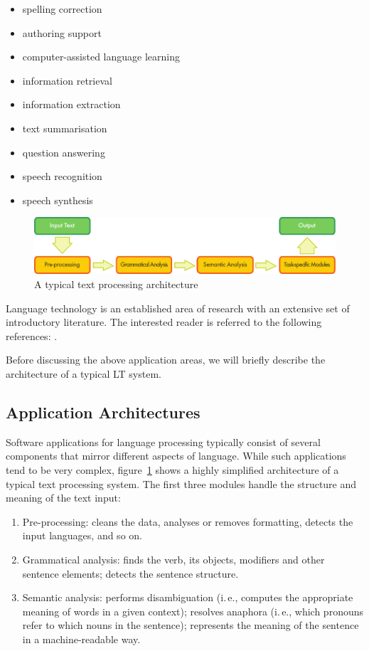 \begin{multicols}{2}
\begin{itemize}
\item spelling correction
\item authoring support
\item computer-assisted language learning
\item information retrieval 
\item information extraction
\item text summarisation
\item question answering
\item speech recognition 
\item speech synthesis 
\end{itemize}

\begin{figure}[b]
  \center
  \includegraphics[width=\textwidth]{../_media/english/text_processing_app_architecture}
  \caption{A typical text processing architecture}
  \label{fig:textprocessingarch_en}
\end{figure}

Language technology is an established area of research with an extensive set of introductory literature. The interested reader is referred to the following references: \cite{jurafsky-martin01, manning-schuetze1, lt-world1, lt-survey1}.

Before discussing the above application areas, we will briefly describe the architecture of a typical LT system.

\subsection{Application Architectures}

Software applications for language processing typically consist of several components that mirror different aspects of language. While such applications tend to be very complex, figure~\ref{fig:textprocessingarch_en} shows a highly simplified architecture of a typical text processing system. The first three modules handle the structure and meaning of the text input:

\begin{enumerate}
\item Pre-processing: cleans the data, analyses or removes formatting, detects the input languages, and so on.
\item Grammatical analysis: finds the verb, its objects, modifiers and other sentence elements; detects the sentence structure.
\item Semantic analysis: performs disambiguation (i.\,e., computes the appropriate meaning of words in a given context); resolves anaphora (i.\,e., which pronouns refer to which nouns in the sentence); represents the meaning of the sentence in a machine-readable way.
\end{enumerate}


\end{multicols}
